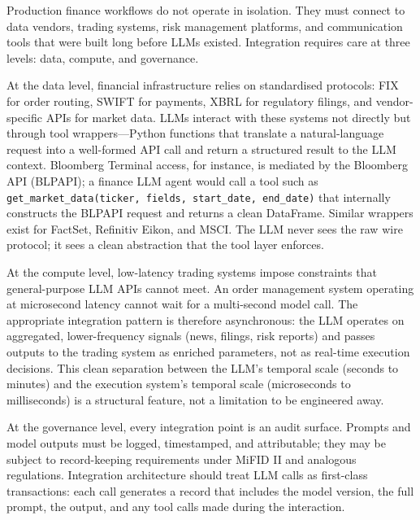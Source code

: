 \begin{context}
Production finance workflows do not operate in isolation. They must connect to data vendors, trading systems, risk management platforms, and communication tools that were built long before LLMs existed. Integration requires care at three levels: data, compute, and governance.

At the data level, financial infrastructure relies on standardised protocols: FIX for order routing, SWIFT for payments, XBRL for regulatory filings, and vendor-specific APIs for market data. LLMs interact with these systems not directly but through tool wrappers---Python functions that translate a natural-language request into a well-formed API call and return a structured result to the LLM context. Bloomberg Terminal access, for instance, is mediated by the Bloomberg API (BLPAPI); a finance LLM agent would call a tool such as \texttt{get\_market\_data(ticker, fields, start\_date, end\_date)} that internally constructs the BLPAPI request and returns a clean DataFrame. Similar wrappers exist for FactSet, Refinitiv Eikon, and MSCI. The LLM never sees the raw wire protocol; it sees a clean abstraction that the tool layer enforces.

At the compute level, low-latency trading systems impose constraints that general-purpose LLM APIs cannot meet. An order management system operating at microsecond latency cannot wait for a multi-second model call. The appropriate integration pattern is therefore asynchronous: the LLM operates on aggregated, lower-frequency signals (news, filings, risk reports) and passes outputs to the trading system as enriched parameters, not as real-time execution decisions. This clean separation between the LLM's temporal scale (seconds to minutes) and the execution system's temporal scale (microseconds to milliseconds) is a structural feature, not a limitation to be engineered away.

At the governance level, every integration point is an audit surface. Prompts and model outputs must be logged, timestamped, and attributable; they may be subject to record-keeping requirements under MiFID II and analogous regulations. Integration architecture should treat LLM calls as first-class transactions: each call generates a record that includes the model version, the full prompt, the output, and any tool calls made during the interaction.

\end{context}



